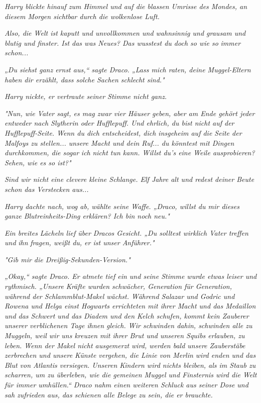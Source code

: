 {\emph{Harry blickte hinauf zum Himmel und auf die blassen Umrisse des Mondes, an diesem Morgen sichtbar durch die wolkenlose Luft.}

\emph{\emph{Also, die Welt ist kaputt und unvollkommen und wahnsinnig und grausam und blutig und finster. Ist das was Neues? Das wusstest du doch so wie so}} \emph{\emph{immer schon...}}

\emph{„Du siehst ganz ernst aus,“ sagte Draco. „Lass mich raten, deine Muggel-Eltern haben dir erzählt, dass solche Sachen schlecht sind."}

\emph{Harry nickte, er vertraute seiner Stimme nicht ganz.}

\emph{"Nun, wie Vater sagt, es mag zwar vier Häuser geben, aber am Ende gehört jeder entweder nach Slytherin oder Hufflepuff. Und ehrlich, du bist nicht auf der Hufflepuff-Seite. Wenn du dich entscheidest, dich insgeheim auf die Seite der Malfoys zu stellen... unsere Macht und dein Ruf... du könntest mit Dingen durchkommen, die sogar} \emph{\emph{ich}} \emph{nicht tun kann. Willst du's eine Weile ausprobieren? Sehen, wie es so ist?"}

\emph{\emph{Sind wir nicht eine clevere kleine Schlange. Elf Jahre alt und redest deiner Beute schon das Verstecken aus...}}

\emph{Harry dachte nach, wog ab, wählte seine Waffe. „Draco, willst du mir dieses ganze Blutreinheits-Ding erklären? Ich bin noch neu."}

\emph{Ein breites Lächeln lief über Dracos Gesicht. „Du solltest wirklich Vater treffen und} \emph{\emph{ihn}} \emph{fragen, weißt du, er ist unser Anführer."}

\emph{"Gib mir die Dreißig-Sekunden-Version."}

\emph{„Okay,“ sagte Draco. Er atmete tief ein und seine Stimme wurde etwas leiser und rythmisch. „Unsere Kräfte wurden schwächer, Generation für Generation, während der Schlammblut-Makel wächst. Während Salazar und Godric und Rowena und Helga einst Hogwarts errichteten mit ihrer Macht und das Medaillon und das Schwert und das Diadem und den Kelch schufen, kommt kein Zauberer unserer verblichenen Tage ihnen gleich. Wir schwinden dahin, schwinden alle zu Muggeln, weil wir uns kreuzen mit ihrer Brut und unseren Squibs erlauben, zu leben. Wenn der Makel nicht ausgemerzt wird, werden bald unsere Zauberstäbe zerbrechen und unsere Künste vergehen, die Linie von Merlin wird enden und das Blut von Atlantis versiegen. Unseren Kindern wird nichts bleiben, als im Staub zu scharren, um zu überleben, wie die gemeinen Muggel und Finsternis wird die Welt für immer umhüllen.“ Draco nahm einen weiteren Schluck aus seiner Dose und sah zufrieden aus, das schienen alle Belege zu sein, die er brauchte.}

}
